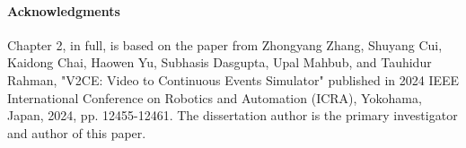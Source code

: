 \paragraph{Acknowledgments}

Chapter 2, in full, is based on the paper from Zhongyang Zhang, Shuyang Cui, Kaidong Chai, Haowen Yu, Subhasis Dasgupta, Upal Mahbub, and Tauhidur Rahman, "V2CE: Video to Continuous Events Simulator" published in 2024 IEEE International Conference on Robotics and Automation (ICRA), Yokohama, Japan, 2024, pp. 12455-12461. The dissertation author is the primary investigator and author of this paper.